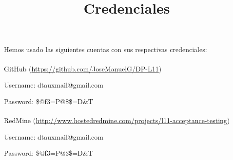 \documentclass[a4paper]{article}
\title{Credenciales}
\date{}
\begin{document}
\setlength{\voffset}{-1in}
\setlength{\textheight}{680px}
\setlength{\headsep}{30px}
\maketitle

Hemos usado las siguientes cuentas con sus respectivas credenciales:
\\
\\
GitHub (\url{https://github.com/JoseManuelG/DP-L11})

Username: dtauxmail@gmail.com

Password: \$@f3=P@\$\$=D\&T
\\
\\
RedMine (\url{http://www.hostedredmine.com/projects/l11-acceptance-testing})

Username: dtauxmail@gmail.com

Password: \$@f3=P@\$\$=D\&T
\end{document}
